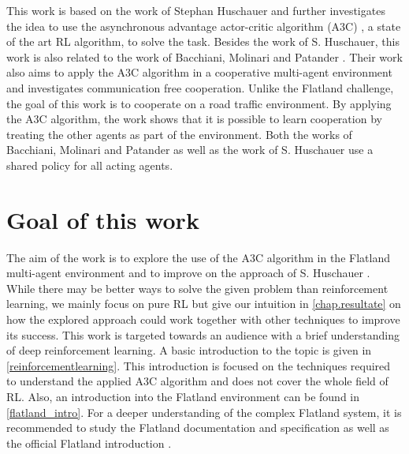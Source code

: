 This work is based on the work of Stephan Huschauer \cite{flatlandstephan} and further investigates the idea to use the asynchronous advantage actor-critic algorithm (A3C) \cite{a3c}, a state of the art RL algorithm, to solve the task.
Besides the work of S. Huschauer, this work is also related to the work of Bacchiani, Molinari and Patander \cite{marltraffica3c}. Their work also aims to apply the A3C algorithm in a cooperative multi-agent environment and investigates communication free cooperation.
Unlike the Flatland challenge, the goal of this work is to cooperate on a road traffic environment. By applying the A3C algorithm, the work shows that it is possible to learn cooperation by treating the other agents as part of the environment. Both the works of Bacchiani, Molinari and Patander as well as the work of S. Huschauer use a shared policy for all acting agents.

\section{Goal of this work}\label{zielsetzung}
The aim of the work is to explore the use of the A3C algorithm in the Flatland multi-agent environment and to improve on the approach of S. Huschauer \cite{flatlandstephan}.\\
While there may be better ways to solve the given problem than reinforcement learning, we mainly focus on pure RL but give our intuition in \autoref{chap.resultate} on how the explored approach could work together with other techniques to improve its success.
This work is targeted towards an audience with a brief understanding of deep reinforcement learning. A basic introduction to the topic is given in \autoref{reinforcementlearning}. This introduction is focused on the techniques required to understand the applied A3C algorithm and does not cover the whole field of RL.
Also, an introduction into the Flatland environment can be found in \autoref{flatland_intro}. For a deeper understanding of the complex Flatland system, it is recommended to study the Flatland documentation and specification \cite{flatland_docu} as well as the official Flatland introduction \cite{aicrowd}.


